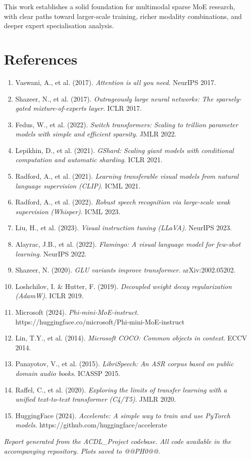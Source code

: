\documentclass[11pt]{article}
\begin{document}
This work establishes a solid foundation for multimodal sparse MoE research, with clear paths toward larger-scale training, richer modality combinations, and deeper expert specialisation analysis.



\section*{References}


\begin{enumerate}[leftmargin=*]
\item Vaswani, A., et al. (2017). \emph{Attention is all you need}. NeurIPS 2017.
\item Shazeer, N., et al. (2017). \emph{Outrageously large neural networks: The sparsely-gated mixture-of-experts layer}. ICLR 2017.
\item Fedus, W., et al. (2022). \emph{Switch transformers: Scaling to trillion parameter models with simple and efficient sparsity}. JMLR 2022.
\item Lepikhin, D., et al. (2021). \emph{GShard: Scaling giant models with conditional computation and automatic sharding}. ICLR 2021.
\item Radford, A., et al. (2021). \emph{Learning transferable visual models from natural language supervision (CLIP)}. ICML 2021.
\item Radford, A., et al. (2022). \emph{Robust speech recognition via large-scale weak supervision (Whisper)}. ICML 2023.
\item Liu, H., et al. (2023). \emph{Visual instruction tuning (LLaVA)}. NeurIPS 2023.
\item Alayrac, J.B., et al. (2022). \emph{Flamingo: A visual language model for few-shot learning}. NeurIPS 2022.
\item Shazeer, N. (2020). \emph{GLU variants improve transformer}. arXiv:2002.05202.
\item Loshchilov, I. \& Hutter, F. (2019). \emph{Decoupled weight decay regularization (AdamW)}. ICLR 2019.
\item Microsoft (2024). \emph{Phi-mini-MoE-instruct}. https://huggingface.co/microsoft/Phi-mini-MoE-instruct
\item Lin, T.Y., et al. (2014). \emph{Microsoft COCO: Common objects in context}. ECCV 2014.
\item Panayotov, V., et al. (2015). \emph{LibriSpeech: An ASR corpus based on public domain audio books}. ICASSP 2015.
\item Raffel, C., et al. (2020). \emph{Exploring the limits of transfer learning with a unified text-to-text transformer (C4/T5)}. JMLR 2020.
\item HuggingFace (2024). \emph{Accelerate: A simple way to train and use PyTorch models}. https://github.com/huggingface/accelerate

\end{enumerate}

\emph{Report generated from the ACDL\_Project codebase. All code available in the accompanying repository. Plots saved to @@PH0@@.}
\end{document}
